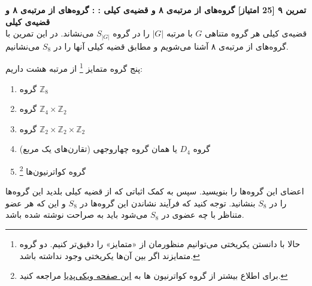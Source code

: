 \documentclass{article}
\newenvironment{exercise}[3][\unskip]{%
	\par
	\noindent
	\textbf{تمرین
		#1
		[#2 امتیاز] 
		\def\temp{#3}\ifx\temp\empty
		: 
		\else
		: #3 \vspace{0.5em} \\ \noindent
		\fi
}}{}
\begin{document}
\begin{exercise}[۹]{25}{
		گروه‌های از مرتبه‌ی ۸ و قضیه‌ی کیلی
	}
	قضیه‌ی کیلی هر گروه متناهی $G$ با مرتبه $|G|$ را در گروه $S_{|G|} $
	می‌نشاند. در این تمرین با گروه‌های از مرتبه‌ی ۸ آشنا می‌شویم و مطابق قضیه کیلی آنها را در 
	$S_8$
	می‌نشانیم.
	
	\noindent
	پنج گروه متمایز
	\footnote{حالا با دانستن یکریختی می‌توانیم منظورمان از  «متمایز» را دقیق‌تر کنیم. دو گروه متمایزند اگر بین‌ آن‌ها یکریختی وجود نداشته باشد.}
	از مرتبه هشت داریم:
		\setlength{\abovedisplayskip}{8pt} \setlength{\belowdisplayskip}{8pt} \setlength{\abovedisplayshortskip}{8pt} \setlength{\belowdisplayshortskip}{8pt}
	\begin{enumerate}

		\item گروه 
		$\mathbb{Z}_8$
		 \item گروه
		 $\mathbb{Z}_4\times \mathbb{Z}_2$
		 \item گروه 
		  $\mathbb{Z}_2\times \mathbb{Z}_2 \times \mathbb{Z}_2$
		  \item  گروه
		  $D_4$ یا همان گروه چهاروجهی (تقارن‌های یک مربع)
		  \item گروه کواترنیون‌ها
		  \footnote{برای اطلاع بیشتر از گروه کواترنیون ها به 
		  \href{https://en.wikipedia.org/wiki/Quaternion_group}{این صفحه ویکی‌پدیا}
		  مراجعه کنید.
		  }
	\end{enumerate}
	اعضای این گروه‌ها را بنویسید. سپس به کمک اثباتی که از قضیه کیلی بلدید این گروه‌ها را در 
	$S_8$
	بنشانید. توجه کنید که فرآیند نشاندن این گروه‌ها در $S_8$ و این که هر عضو متناظر با چه عضوی در $S_8$ می‌شود باید به صراحت نوشته شده باشد.
\end{exercise}
\end{document}
